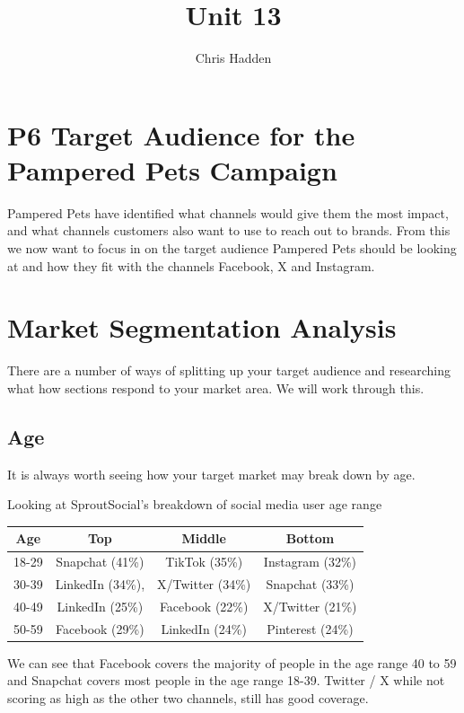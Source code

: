 \documentclass{article}
\begin{document}
\title{Unit 13}
\author{Chris Hadden}
\date{}
\maketitle

\section{P6 Target Audience for the Pampered Pets Campaign}
Pampered Pets have identified what channels would give them the most impact, and what channels customers also want to use to reach out to brands. From this we now want to focus in on the target audience Pampered Pets should be looking at and how they fit with the channels Facebook, X and Instagram.

\section{Market Segmentation Analysis}
There are a number of ways of splitting up your target audience and researching what how sections respond to your market area. We will work through this.

\subsection{Age}
It is always worth seeing how your target market may break down by age. 

Looking at SproutSocial's breakdown of social media user age range \cite{sproutage}
\begin{center}
    \begin{tabular}{||c c c c||} 
     \hline
     Age & Top & Middle & Bottom \\ [0.5ex] 
     \hline\hline
     18-29 & Snapchat (41\%) & TikTok (35\%) & Instagram (32\%) \\ 
     \hline
     30-39 & LinkedIn (34\%), & X/Twitter (34\%) & Snapchat (33\%) \\
     \hline
     40-49 & LinkedIn (25\%) & Facebook (22\%) & X/Twitter (21\%) \\
     \hline
     50-59 & Facebook (29\%) & LinkedIn (24\%) & Pinterest (24\%) \\
     \hline
    \end{tabular}
    \label {Age ranges of social media}
    \end{center}

We can see that Facebook covers the majority of people in the age range 40 to 59 and Snapchat covers most people in the age range 18-39. Twitter / X while not scoring as high as the other two channels, still has good coverage. 
\end{document}
